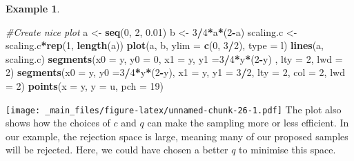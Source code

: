 \documentclass[
]{book}
\newenvironment{Shaded}{\begin{snugshade}}{\end{snugshade}}
\newcommand{\AttributeTok}[1]{\textcolor[rgb]{0.13,0.29,0.53}{#1}}
\newcommand{\CommentTok}[1]{\textcolor[rgb]{0.56,0.35,0.01}{\textit{#1}}}
\newcommand{\DecValTok}[1]{\textcolor[rgb]{0.00,0.00,0.81}{#1}}
\newcommand{\FloatTok}[1]{\textcolor[rgb]{0.00,0.00,0.81}{#1}}
\newcommand{\FunctionTok}[1]{\textcolor[rgb]{0.13,0.29,0.53}{\textbf{#1}}}
\newcommand{\NormalTok}[1]{#1}
\newcommand{\OtherTok}[1]{\textcolor[rgb]{0.56,0.35,0.01}{#1}}
\newcommand{\SpecialCharTok}[1]{\textcolor[rgb]{0.81,0.36,0.00}{\textbf{#1}}}
\newcommand{\StringTok}[1]{\textcolor[rgb]{0.31,0.60,0.02}{#1}}
\theoremstyle{definition}
\theoremstyle{definition}
\newtheorem{example}{Example}[chapter]
\theoremstyle{definition}
\theoremstyle{definition}
\theoremstyle{remark}
\begin{document}
\begin{example}
\begin{Shaded}
\begin{Highlighting}[]
\CommentTok{\#Create nice plot}
\NormalTok{a }\OtherTok{\textless{}{-}} \FunctionTok{seq}\NormalTok{(}\DecValTok{0}\NormalTok{, }\DecValTok{2}\NormalTok{, }\FloatTok{0.01}\NormalTok{)}
\NormalTok{b }\OtherTok{\textless{}{-}} \DecValTok{3}\SpecialCharTok{/}\DecValTok{4}\SpecialCharTok{*}\NormalTok{a}\SpecialCharTok{*}\NormalTok{(}\DecValTok{2}\SpecialCharTok{{-}}\NormalTok{a)}
\NormalTok{scaling.c  }\OtherTok{\textless{}{-}}\NormalTok{ scaling.c}\SpecialCharTok{*}\FunctionTok{rep}\NormalTok{(}\DecValTok{1}\NormalTok{, }\FunctionTok{length}\NormalTok{(a))}
\FunctionTok{plot}\NormalTok{(a, b, }\AttributeTok{ylim =} \FunctionTok{c}\NormalTok{(}\DecValTok{0}\NormalTok{, }\DecValTok{3}\SpecialCharTok{/}\DecValTok{2}\NormalTok{), }\AttributeTok{type =} \StringTok{\textquotesingle{}l\textquotesingle{}}\NormalTok{)}
\FunctionTok{lines}\NormalTok{(a, scaling.c)}
\FunctionTok{segments}\NormalTok{(}\AttributeTok{x0 =}\NormalTok{ y, }\AttributeTok{y0 =} \DecValTok{0}\NormalTok{, }\AttributeTok{x1 =}\NormalTok{ y,  }\AttributeTok{y1 =}\DecValTok{3}\SpecialCharTok{/}\DecValTok{4}\SpecialCharTok{*}\NormalTok{y}\SpecialCharTok{*}\NormalTok{(}\DecValTok{2}\SpecialCharTok{{-}}\NormalTok{y) , }
          \AttributeTok{lty =} \DecValTok{2}\NormalTok{, }\AttributeTok{lwd =} \DecValTok{2}\NormalTok{)}
\FunctionTok{segments}\NormalTok{(}\AttributeTok{x0 =}\NormalTok{ y,  }\AttributeTok{y0 =}\DecValTok{3}\SpecialCharTok{/}\DecValTok{4}\SpecialCharTok{*}\NormalTok{y}\SpecialCharTok{*}\NormalTok{(}\DecValTok{2}\SpecialCharTok{{-}}\NormalTok{y), }\AttributeTok{x1 =}\NormalTok{ y, }\AttributeTok{y1 =} \DecValTok{3}\SpecialCharTok{/}\DecValTok{2}\NormalTok{, }\AttributeTok{lty =} \DecValTok{2}\NormalTok{, }
          \AttributeTok{col =} \DecValTok{2}\NormalTok{, }\AttributeTok{lwd =} \DecValTok{2}\NormalTok{)}
\FunctionTok{points}\NormalTok{(}\AttributeTok{x =}\NormalTok{ y, }\AttributeTok{y =}\NormalTok{ u, }\AttributeTok{pch =} \DecValTok{19}\NormalTok{)}
\end{Highlighting}
\end{Shaded}

\texttt{[image: \_main\_files/figure-latex/unnamed-chunk-26-1.pdf]}
The plot also shows how the choices of \(c\) and \(q\) can make the sampling more or less efficient. In our example, the rejection space is large, meaning many of our proposed samples will be rejected. Here, we could have chosen a better \(q\) to minimise this space.
\end{example}
\end{document}
